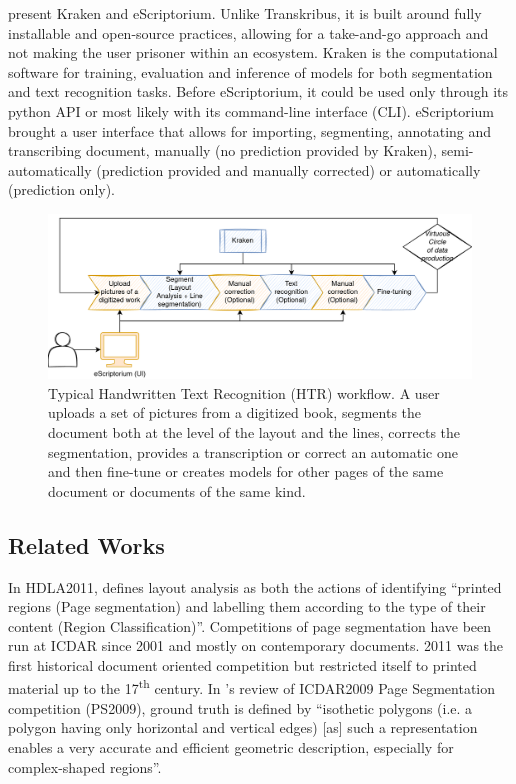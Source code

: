\documentclass{jdmdh}
\begin{document}
\citet{kiessling2019escriptorium} present Kraken and eScriptorium. Unlike Transkribus, it is built around fully installable and open-source practices, allowing for a take-and-go approach and not making the user prisoner within an ecosystem. Kraken is the computational software for training, evaluation and inference of models for both segmentation and text recognition tasks. Before eScriptorium, it could be used only through its python API or most likely with its command-line interface (CLI). eScriptorium brought a user interface that allows for importing, segmenting, annotating and transcribing document, manually (no prediction provided by Kraken), semi-automatically (prediction provided and manually corrected) or automatically (prediction only).

\begin{figure}[h]
    \centering
    \includegraphics[width=\linewidth]{images/kraken-escriptorium.png}
    \caption{Typical Handwritten Text Recognition (HTR) workflow. A user uploads a set of pictures from a digitized book, segments the document both at the level of the layout and the lines, corrects the segmentation, provides a transcription or correct an automatic one and then fine-tune or creates models for other pages of the same document or documents of the same kind.}
    \label{fig:htr-workflow}
\end{figure}

\subsection{Related Works}

In HDLA2011, \citet{antonacopoulos2011historical} defines layout analysis as both the actions of identifying ``printed regions (Page segmentation) and labelling them according to the type of their content (Region Classification)''. Competitions of page segmentation have been run at ICDAR since 2001 and mostly on contemporary documents. 2011 was the first historical document oriented competition but restricted itself to printed material up to the 17\textsuperscript{th} century. In \citet{antonacopoulos2009icdar}'s review of ICDAR2009 Page Segmentation competition (PS2009), ground truth is defined by ``isothetic polygons (i.e. a polygon having only horizontal and vertical edges) [as] such a representation enables a very accurate and efficient geometric description, especially for complex-shaped regions''. 
\end{document}
